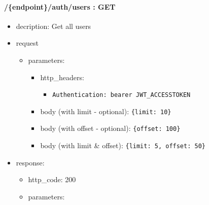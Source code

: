 \documentclass[
]{article}
\begin{document}
\hypertarget{header-n60685}{%
\paragraph{/\{endpoint\}/auth/users : GET}\label{header-n60685}}

\begin{itemize}
\item
  decription: Get all users
\item
  request

  \begin{itemize}
  \item
    parameters:

    \begin{itemize}
    \item
      http\_headers:

      \begin{itemize}
      \item
        \texttt{Authentication:\ \textquotesingle{}bearer\ JWT\_ACCESSTOKEN\textquotesingle{}}
      \end{itemize}
    \item
      body (with limit - optional):
      \texttt{\{\textquotesingle{}limit\textquotesingle{}:\ 10\}}
    \item
      body (with offset - optional):
      \texttt{\{\textquotesingle{}offset\textquotesingle{}:\ 100\}}
    \item
      body (with limit \& offset):
      \texttt{\{\textquotesingle{}limit\textquotesingle{}:\ 5,\ \textquotesingle{}offset\textquotesingle{}:\ 50\}}
    \end{itemize}
  \end{itemize}
\item
  response:

  \begin{itemize}
  \item
    http\_code: 200
  \item
    parameters:


\end{itemize}
\end{itemize}
\end{document}
